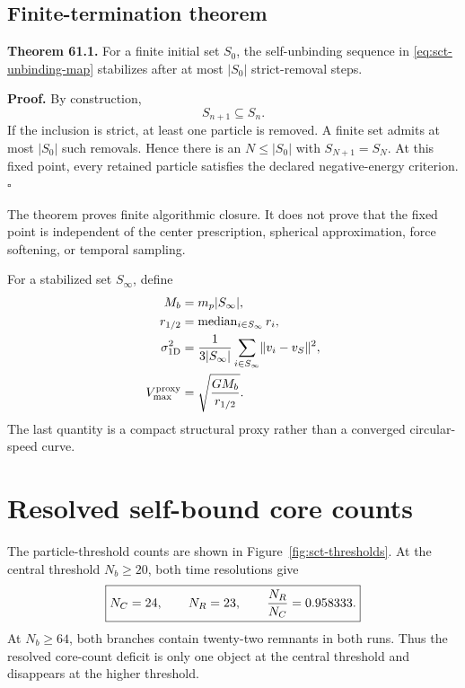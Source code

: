 \subsection{Finite-termination theorem}

\textbf{Theorem 61.1.}
For a finite initial set $S_0$, the self-unbinding sequence in \eqref{eq:sct-unbinding-map} stabilizes after at most $|S_0|$ strict-removal steps.

\textbf{Proof.}
By construction,
\begin{equation}
S_{n+1}\subseteq S_n.
\label{eq:sct-nested}
\end{equation}
If the inclusion is strict, at least one particle is removed.  A finite set admits at most $|S_0|$ such removals.  Hence there is an $N\le|S_0|$ with $S_{N+1}=S_N$.  At this fixed point, every retained particle satisfies the declared negative-energy criterion.  \hfill$\square$

The theorem proves finite algorithmic closure.  It does not prove that the fixed point is independent of the center prescription, spherical approximation, force softening, or temporal sampling.

For a stabilized set $S_\infty$, define
\begin{align}
M_b&=m_p|S_\infty|,\label{eq:sct-bound-mass}\\
r_{1/2}&=\operatorname{median}_{i\in S_\infty}r_i,\label{eq:sct-rhalf}\\
\sigma_{1\rm D}^2&=\frac1{3|S_\infty|}\sum_{i\in S_\infty}\lVert v_i-v_S\rVert^2,\label{eq:sct-sigma}\\
V_{\max}^{\rm proxy}&=\sqrt{\frac{GM_b}{r_{1/2}}}.\label{eq:sct-vmax}
\end{align}
The last quantity is a compact structural proxy rather than a converged circular-speed curve.

\section{Resolved self-bound core counts}

The particle-threshold counts are shown in Figure~\ref{fig:sct-thresholds}.  At the central threshold $N_b\ge20$, both time resolutions give
\begin{equation}
\boxed{
N_{C}=24,
\qquad
N_{R}=23,
\qquad
\frac{N_R}{N_C}=0.958333.
}
\label{eq:sct-bound-count}
\end{equation}
At $N_b\ge64$, both branches contain twenty-two remnants in both runs.  Thus the resolved core-count deficit is only one object at the central threshold and disappears at the higher threshold.

